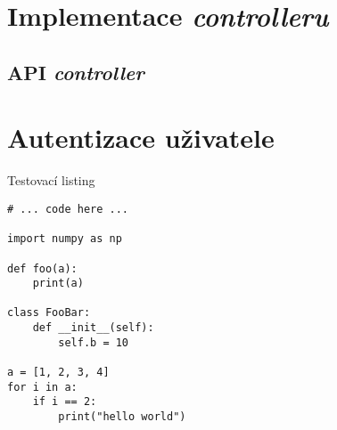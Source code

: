 
\section{Implementace \textit{controlleru}}


\subsection{API \textit{controller}}


\section{Autentizace uživatele}
\label{sec:im_auth}






\begin{listing}[htbp]
\caption{\label{code:foo} Testovací listing}
\begin{verbatim}
# ... code here ...

import numpy as np

def foo(a):
    print(a)

class FooBar:
    def __init__(self):
        self.b = 10

a = [1, 2, 3, 4]
for i in a:
    if i == 2:
        print("hello world")
\end{verbatim}
\end{listing}